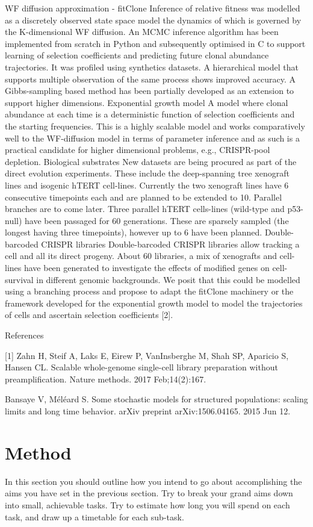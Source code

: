 \documentclass[12pt, a4paper]{article}
\begin{document}
WF diffusion approximation - fitClone
Inference of relative fitness was modelled as a discretely observed state space model the dynamics of which is governed by the K-dimensional WF diffusion. An MCMC inference algorithm has been implemented from scratch in Python and subsequently optimised in C to support learning of selection coefficients and predicting future clonal abundance trajectories. It was profiled using synthetics datasets. A hierarchical model that supports multiple observation of the same process shows improved accuracy. A Gibbs-sampling based method has been partially developed as an extension to support higher dimensions. 
Exponential growth model
A model where clonal abundance at each time is a deterministic function of selection coefficients and the starting frequencies. This is a highly scalable model and works comparatively well to the WF-diffusion model in terms of parameter inference and as such is a practical candidate for higher dimensional problems, e.g., CRISPR-pool depletion.
Biological substrates
New datasets are being procured as part of the direct evolution experiments. These include the deep-spanning tree xenograft lines and isogenic hTERT cell-lines. Currently the two xenograft lines have 6 consecutive timepoints each and are planned to be extended to 10. Parallel branches are to come later. 
Three parallel hTERT cells-lines (wild-type and p53-null) have been passaged for 60 generations. These are sparsely sampled (the longest having three timepoints), however up to 6 have been planned.
Double-barcoded CRISPR libraries
Double-barcoded CRISPR libraries allow tracking a cell and all its direct progeny. About 60 libraries, a mix of xenografts and cell-lines have been generated to investigate the effects of modified genes on cell-survival in different genomic backgrounds. We posit that this could be modelled using a branching process and propose to adapt the fitClone machinery or the framework developed for the exponential growth model to model the trajectories of cells and ascertain selection coefficients [2].  
			
					
References						
					
[1] Zahn H, Steif A, Laks E, Eirew P, VanInsberghe M, Shah SP, Aparicio S, Hansen CL. Scalable whole-genome single-cell library preparation without preamplification. Nature methods. 2017 Feb;14(2):167.

Bansaye V, Méléard S. Some stochastic models for structured populations: scaling limits and long time behavior. arXiv preprint arXiv:1506.04165. 2015 Jun 12.

 
\section*{Method}
In this section you should outline how you intend to go
about accomplishing the aims you have set in the previous
section. Try to break your grand aims down into small,
achievable tasks. Try to estimate how long you will
spend on each task, and draw up a timetable for each
sub-task.\cite{jorde1999estimating}




 
\end{document}
